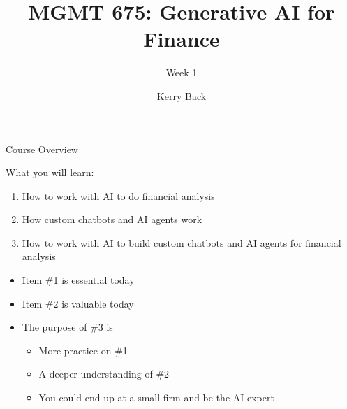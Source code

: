 \documentclass{beamer}
\title{MGMT 675: Generative AI for Finance}
\subtitle{Week 1}
\author{Kerry Back}
\begin{document}
\maketitle

\begin{frame}{Course Overview}

What you will learn:
\begin{enumerate}
\item How to work with AI to do financial analysis
\item How custom chatbots and AI agents work 
\item How to work with AI to build custom chatbots and AI agents for financial analysis
\end{enumerate}

\begin{itemize}
\item Item \#1 is essential today 
\item Item \#2 is valuable today
\item The purpose of  \#3 is
\begin{itemize}
\item More practice on  \#1
\item A deeper understanding of  \#2
\item You could end up at a small firm and be the AI expert
\end{itemize}
\end{itemize}
\end{frame}
\end{document}
